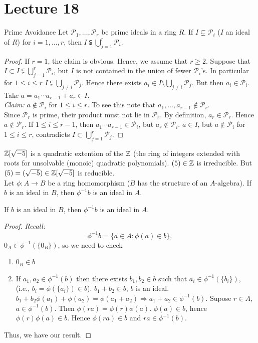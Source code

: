 \documentclass[twoside, openright, fontsize=10pt, headings=big]{scrbook}
\begin{document}
\chapter{Lecture 18}
\begin{proposition}{Prime Avoidance}{}    
    Let $\mathcal{P}_1,\dots,\mathcal{P}_r$ be prime ideals in a ring $R$. If $I\subsetneq \mathcal{P}_i$ ($I$ an ideal of $R$) for $i=1,\dots,r$, then $I\subsetneqq\bigcup_{j=1}^r\mathcal{P}_i$.
\end{proposition}
\begin{proof}
    If $r=1$, the claim is obvious. Hence, we assume that $r\geq2.$ Suppose that $I\subset I\subsetneqq\bigcup_{j=1}^r\mathcal{P}_i$, but $I$ is not contained in the union of fewer $\mathcal{P}_i$'s. In particular for $1\leq i\leq r$ $I\subsetneqq\bigcup_{j\neq i}\mathcal{P}_j$. Hence there exists $a_i\in I\setminus\bigcup_{j\neq i}\mathcal{P}_j$. But then $a_i\in\mathcal{P}_i$. Take $a=a_1\cdots a_{r-1}+a_r\in I$.\\
    \textit{Claim:} $a\not\in\mathcal{P}_i$ for $1\leq i\leq r$. To see this note that $a_1,\dots,a_{r-1}\not\in\mathcal{P}_r$.\\
    Since $\mathcal{P}_r$ is prime, their product must not lie in $\mathcal{P}_r$. By definition, $a_r\in\mathcal{P}_r$. Hence $a\not\in\mathcal{P}_r$. If $1\leq i\leq r-1$, then $a_1\cdots a_{r-1}\in\mathcal{P}_i$, but $a_r\not\in\mathcal{P}_i$. $a\in I$, but $a\not\in\mathcal{P}_i$ for $1\leq i\leq r$, contradicts $I\subset\bigcup_{j=1}^r\mathcal{P}_j$.
\end{proof}
$\mathbb{Z}[\sqrt{-5}]$ is a quadratic extention of the $\mathbb{Z}$ (the ring of integers extended with roots for unsolvable (monoic) quadratic polynomials). $(5)\in\mathbb{Z}$ is irreducible. But $(5)=(\sqrt{-5})\in\mathbb{Z}[\sqrt{-5}]$ is reducible.\\
Let $\phi:A\to B$ be a ring homomorphism ($B$ has the structure of an $A$-algebra). If $b$ is an ideal in $B$, then $\phi^{-1}b$ is an ideal in $A$. 
\begin{lemma}{}{}
    If $b$ is an ideal in $B$, then $\phi^{-1}b$ is an ideal in $A$.\\
\end{lemma}
\begin{proof}
    \textit{Recall:}
    \[
        \phi^{-1}b=\{a\in A:\phi(a)\in b\},
    \]
    $0_A\in\phi^{-1}(\{0_B\})$, so we need to check 
    \begin{enumerate}
        \item $0_B\in b$
        \item If $a_1,a_2\in\phi^{-1}(b)$ then there exists $b_1,b_2\in b$ such that $a_i\in\phi^{-1}(\{b_i\})$, (i.e., $b_i=\phi(\{a_i\})\in b$). $b_1+b_2\in b$, $b$ is an ideal. $b_1+b_2\phi(a_1)+\phi(a_2)=\phi(a_1+a_2)\Rightarrow a_1+a_2\in\phi^{-1}(b)$. Supose $r\in A$, $a\in\phi^{-1}(b)$. Then $\phi(ra)=\phi(r)\phi(a)$. $\phi(a)\in b$, hence $\phi(r)\phi(a)\in b$. Hence $\phi(ra)\in b$ and $ra\in\phi^{-1}(b)$.
    \end{enumerate}
    Thus, we have our result.
\end{proof}
\end{document}
